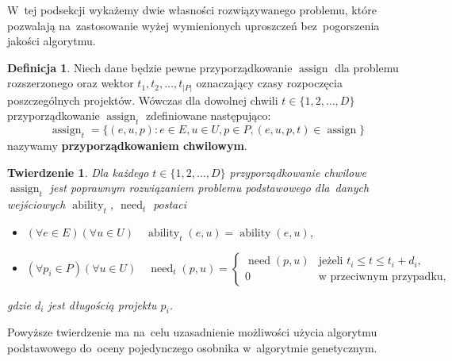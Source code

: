 \documentclass[12pt,a4paper]{article}
\newtheorem{thm}{Twierdzenie}
\theoremstyle{definition}
\newtheorem{defn}{Definicja}
\DeclareMathOperator{\ability}{ability}
\DeclareMathOperator{\need}{need}
\DeclareMathOperator{\assign}{assign}
\begin{document}
\noindent
W~tej podsekcji wykażemy dwie własności rozwiązywanego problemu, które pozwalają na~zastosowanie wyżej wymienionych uproszczeń bez~pogorszenia jakości algorytmu.

\newpage
\begin{defn}
Niech dane będzie pewne przyporządkowanie $\assign$ dla problemu rozszerzonego oraz wektor $t_1, t_2, \dots, t_{|P|}$ oznaczający czasy rozpoczęcia poszczególnych projektów.
Wówczas dla dowolnej chwili $t \in \{ 1, 2, \dots, D \}$ przyporządkowanie $\assign_t$ zdefiniowane następująco:
$$ \assign_t = \{ (e, u, p) : e \in E, u \in U, p \in P, (e, u, p, t) \in \assign \} $$
nazywamy \textbf{przyporządkowaniem chwilowym}.
\end{defn}

\begin{thm}
\label{thm:assignmoment}
Dla każdego $t \in \{ 1, 2, \dots, D \}$ przyporządkowanie chwilowe $\assign_t$ jest poprawnym rozwiązaniem problemu podstawowego dla~danych wejściowych $\ability_t$, $\need_t$ postaci
\begin{itemize}
	\item $(\forall e \in E) (\forall u \in U) \quad \ability_t(e, u) = \ability(e, u)$,
	\item $(\forall p_i \in P) (\forall u \in U) \quad \need_t(p, u) = \begin{cases}
		\need(p, u) & \text{jeżeli } t_i \leq t \leq t_i + d_i, \\
		0 & \text{w przeciwnym przypadku},
	\end{cases}$
\end{itemize} 
gdzie $d_i$ jest długością projektu $p_i$.
\end{thm}

\noindent
Powyższe twierdzenie ma na~celu uzasadnienie możliwości użycia algorytmu podstawowego do~oceny pojedynczego osobnika w~algorytmie genetycznym.
\end{document}
